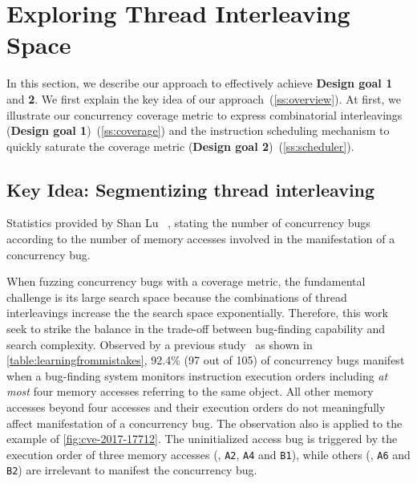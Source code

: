 \section{Exploring Thread Interleaving Space}
\label{s:design}

In this section, we describe our approach to effectively achieve
\textbf{Design goal 1} and \textbf{2}.
%
We first explain the key idea of our approach~(\autoref{ss:overview}). 
At first, we illustrate our concurrency
coverage metric to express combinatorial interleavings 
(\textbf{Design goal 1})~(\autoref{ss:coverage}) and the instruction scheduling mechanism
to quickly saturate the coverage metric (\textbf{Design goal 2})~(\autoref{ss:scheduler}).


\subsection{Key Idea: Segmentizing thread interleaving}
\label{ss:overview}

\begin{table}[t]
  \centering
  
  \caption{Statistics provided by Shan Lu
    \etal~\cite{learningfrommistakes}, stating the number of
    concurrency bugs according to the number of memory accesses
    involved in the manifestation of a concurrency bug.}
  \label{table:learningfrommistakes}
\end{table}

When fuzzing concurrency bugs with a coverage metric, the fundamental challenge is its large search space because
the combinations of thread interleavings increase the 
the search space exponentially. Therefore, this work seek to 
strike the balance
in the trade-off between bug-finding capability and search 
complexity. Observed by a previous study~\cite{learningfrommistakes}
as shown in \autoref{table:learningfrommistakes}, 92.4\% (97 out of
105) of concurrency bugs manifest when a bug-finding system 
monitors instruction execution orders including \textit{at most} 
four memory accesses referring to the same object.
All other memory
accesses beyond four accesses and their execution orders do not
meaningfully affect manifestation of a concurrency bug. 
The observation also is applied to the example of \autoref{fig:cve-2017-17712}. The uninitialized access bug is triggered by 
the execution order of three
memory accesses (\eg, \texttt{A2}, \texttt{A4} and \texttt{B1}), while
others (\eg, \texttt{A6} and \texttt{B2}) are irrelevant to manifest the
concurrency bug.


